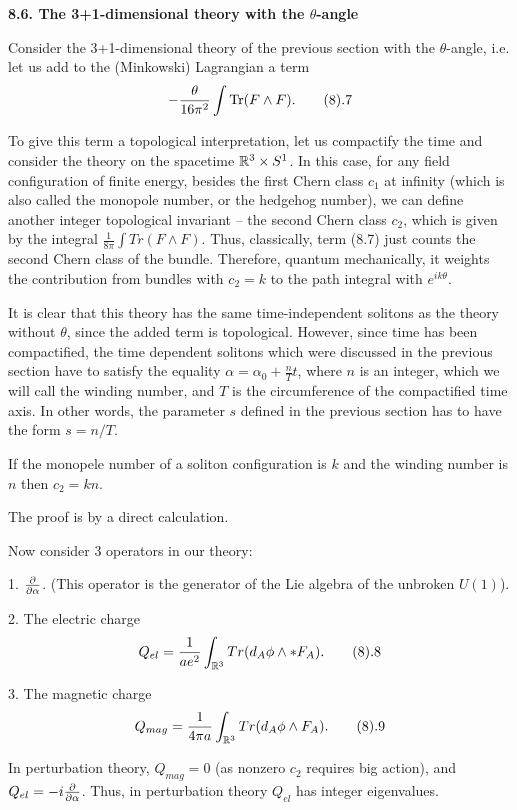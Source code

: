 {\bf 8.6. The 3+1-dimensional theory with the $\theta$-angle}

Consider the 3+1-dimensional theory of the previous section with the 
$\theta$-angle, i.e. let us add to the (Minkowski) Lagrangian a term
$$
-\frac{\theta}{16\pi^2}\int \text{Tr}(F\wedge F).\tag 8.7
$$

To give this term a topological interpretation, let us compactify the time
and consider the theory on the spacetime $\Bbb R^3\times S^1$. 
In this case, for any field configuration of finite energy, 
besides the first Chern class $c_1$ at infinity 
(which is also called the monopole number, or the hedgehog number),
we can define another integer topological invariant -- 
the second Chern class $c_2$, which is given by the integral 
$\frac{1}{8\pi}\int Tr(F\wedge F)$. Thus, 
classically, term (8.7) just counts the second Chern class 
of the bundle. Therefore,  
quantum mechanically, it weights the contribution 
from bundles with $c_2=k$ to the path integral with $e^{ik\theta}$.

It is clear that this theory has the same time-independent 
solitons as the theory 
without $\theta$, since the added term is topological. 
However, since time has been compactified, the time dependent solitons 
which were discussed in the previous section have to 
satisfy the equality $\alpha=\alpha_0+\frac{n}{T}t$, where $n$ is an integer,
which we will call the winding number,  
and $T$ is the circumference of the compactified time axis. In other words, the
parameter $s$ defined in the previous section has 
to have the form $s=n/T$. 

 If the monopele number of a soliton configuration 
is $k$ and the winding number is $n$ then $c_2=kn$. 
\endproclaim

The proof is by a direct calculation. 

Now 
consider 3 operators in our theory:

1. $\frac{\partial}{\partial\alpha}$. (This operator is 
the generator of the Lie algebra of the unbroken 
$U(1)$). 

2. The electric charge 
$$
Q_{el}=\frac{1}{ae^2}\int_{\R^3} Tr(d_A\phi\wedge *F_A).\tag 8.8
$$

3. The magnetic charge
$$
Q_{mag}=\frac{1}{4\pi a}\int_{\R^3} Tr(d_A\phi\wedge F_A).\tag 8.9
$$

In perturbation theory, $Q_{mag}=0$ (as nonzero $c_2$ requires big action), 
and $Q_{el}=-i\frac{\partial}{\partial\alpha}$. Thus, in perturbation theory 
$Q_{el}$ has integer eigenvalues. 

